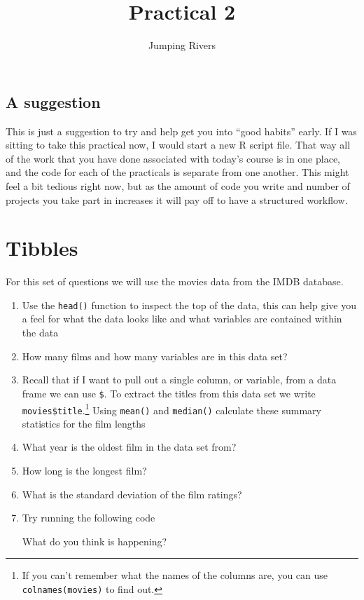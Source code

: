 \documentclass[]{tufte-handout}
\title{Practical 2}
\author{Jumping Rivers}
\date{}
\newenvironment{Shaded}{}{}
\newcommand{\KeywordTok}[1]{\textcolor[rgb]{0.00,0.44,0.13}{\textbf{#1}}}
\newcommand{\NormalTok}[1]{#1}
\newcommand{\OperatorTok}[1]{\textcolor[rgb]{0.40,0.40,0.40}{#1}}
\begin{document}
\maketitle




\hypertarget{a-suggestion}{%
\subsection{A suggestion}\label{a-suggestion}}

This is just a suggestion to try and help get you into ``good habits''
early. If I was sitting to take this practical now, I would start a new
R script file. That way all of the work that you have done associated
with today's course is in one place, and the code for each of the
practicals is separate from one another. This might feel a bit tedious
right now, but as the amount of code you write and number of projects
you take part in increases it will pay off to have a structured
workflow.

\hypertarget{tibbles}{%
\section{Tibbles}\label{tibbles}}

For this set of questions we will use the movies data from the IMDB
database.

\begin{enumerate}
\def\labelenumi{\arabic{enumi}.}
\item
  Use the \texttt{head()} function to inspect the top of the data, this
  can help give you a feel for what the data looks like and what
  variables are contained within the data
\item
  How many films and how many variables are in this data set?
\item
  Recall that if I want to pull out a single column, or variable, from a
  data frame we can use \texttt{\$}. To extract the titles from this
  data set we write \texttt{movies\$title}.\footnote{If you can't
    remember what the names of the columns are, you can use
    \texttt{colnames(movies)} to find out.} Using \texttt{mean()} and
  \texttt{median()} calculate these summary statistics for the film
  lengths
\item
  What year is the oldest film in the data set from?
\item
  How long is the longest film?
\item
  What is the standard deviation of the film ratings?
\item
  Try running the following code

\begin{Shaded}
\end{Shaded}

  What do you think is happening?
\end{enumerate}
\end{document}

